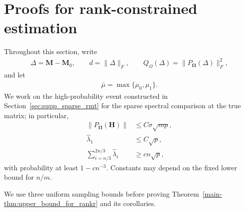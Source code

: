 \documentclass[numsec,webpdf,modern,large,namedate]{oup-authoring-template}
\theoremstyle{plain}
\theoremstyle{remark}
\newcommand{\M}{\bm{M}}
\newcommand{\bH}{\bm{H}}
\newcommand{\bOmega}{\bm{\Omega}}
\newif\ifmarkchanges
\newenvironment{revision}{\begingroup\ifmarkchanges\color{red}\fi}{\endgroup}
\begin{document}
\begin{revision}
\section{Proofs for rank-constrained estimation}
\label{sec:proof_factor}

Throughout this section, write
\begin{align*}
    \Delta=\M-\M_0,\qquad
    d=\|\Delta\|_F,\qquad
    Q_{\Omega}(\Delta)=\|P_{\bOmega}(\Delta)\|_F^2,
\end{align*}
and let
\begin{align*}
    \bar\mu=\max\{\mu_0,\mu_1\}.
\end{align*}
We work on the high-probability event constructed in Section~\ref{sec:supp_sparse_rmt}
for the sparse spectral comparison at the true matrix; in particular,
\begin{align}
\label{eq:factor_noise_edge_event}
    \|P_{\bOmega}(\bH)\|
    &\le C\sigma\sqrt{mp},\\
\label{eq:factor_reference_edge_event}
    \widehat\lambda_1&\le C\sqrt p,\\
\label{eq:factor_reference_bulk_event}
    \sum_{i=n/3}^{2n/3}\widehat\lambda_i&\ge c n\sqrt p,
\end{align}
with probability at least $1-cn^{-3}$.  Constants may depend on the fixed lower bound for $n/m$.

We use three uniform sampling bounds before proving
Theorem~\ref{main-thm:upper_bound_for_rankr} and its corollaries.


\end{revision}
\end{document}
